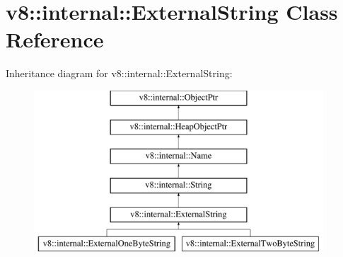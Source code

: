 \hypertarget{classv8_1_1internal_1_1ExternalString}{}\section{v8\+:\+:internal\+:\+:External\+String Class Reference}
\label{classv8_1_1internal_1_1ExternalString}
Inheritance diagram for v8\+:\+:internal\+:\+:External\+String\+:\begin{figure}[H]
\begin{center}
\leavevmode
\includegraphics[height=6.000000cm]{classv8_1_1internal_1_1ExternalString}
\end{center}
\end{figure}
